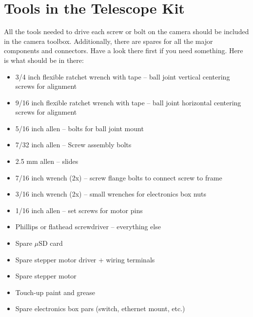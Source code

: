 \documentclass[11pt]{article}
\begin{document}
\newpage
\section{Tools in the Telescope Kit}

All the tools needed to drive each screw or bolt on the camera should be included in the camera toolbox. 
Additionally, there are spares for all the major components and connectors.
Have a look there first if you need something.
Here is what should be in there:

\begin{itemize}
	\item 3/4 inch flexible ratchet wrench with tape -- ball joint vertical centering screws for alignment
	\item 9/16 inch flexible ratchet wrench with tape -- ball joint horizontal centering screws for alignment
	\item 5/16 inch allen -- bolts for ball joint mount
	\item 7/32 inch allen -- Screw assembly bolts
	\item 2.5 mm allen -- slides
	\item 7/16 inch wrench (2x) -- screw flange bolts to connect screw to frame
	\item 3/16 inch wrench (2x) -- small wrenches for electronics box nuts
	\item 1/16 inch allen -- set screws for motor pins
	\item Phillips or flathead screwdriver -- everything else
	\item Spare $\mu$SD card
	\item Spare stepper motor driver + wiring terminals
	\item Spare stepper motor
	\item Touch-up paint and grease
	\item Spare electronics box pars (switch, ethernet mount, etc.)
\end{itemize}
\end{document}
